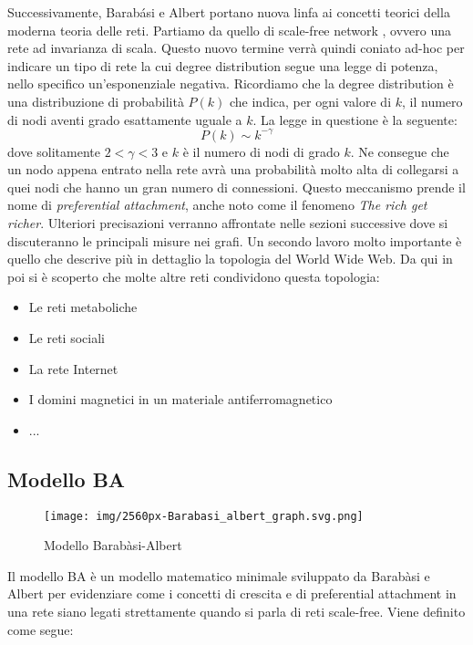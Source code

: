\documentclass[12pt,twoside]{report}
\begin{document}
	Successivamente, Barabási e Albert portano nuova linfa ai concetti teorici della moderna teoria delle reti. Partiamo da quello di scale-free network \cite{scalinginrandomnetworks}, ovvero una rete ad invarianza di scala. Questo nuovo termine verrà quindi coniato ad-hoc per indicare un tipo di rete la cui degree distribution segue una legge di potenza, nello specifico un'esponenziale negativa. Ricordiamo che la degree distribution è una distribuzione di probabilità $P(k)$ che indica, per ogni valore di $k$, il numero di nodi aventi grado esattamente uguale a $k$. La legge in questione è la seguente:
	\begin{equation}
	    P(k) \sim k^{-\gamma}
	\end{equation}
	dove solitamente $2<\gamma<3$ e $k$ è il numero di nodi di grado $k$.
	Ne consegue che un nodo appena entrato nella rete avrà una probabilità molto alta di collegarsi a quei nodi che hanno un gran numero di connessioni. Questo meccanismo prende il nome di \textit{preferential attachment}, anche noto come il fenomeno \textit{The rich get richer}.
	Ulteriori precisazioni verranno affrontate nelle sezioni successive dove si discuteranno le principali misure nei grafi.
	Un secondo lavoro molto importante è quello che descrive più in dettaglio la topologia del World Wide Web\cite{wwwpowerlaw}. Da qui in poi si è scoperto che molte altre reti condividono questa topologia:
	\begin{itemize}
	    \item Le reti metaboliche
	    \item Le reti sociali
	    \item La rete Internet
	    \item I domini magnetici in un materiale antiferromagnetico
	    \item ...
	\end{itemize}\clearpage
	
	\subsection{Modello BA}
	
	\begin{figure}[h]
	    \centering
	    \texttt{[image: img/2560px-Barabasi\_albert\_graph.svg.png]}
	    \caption{Modello Barabàsi-Albert}
	    \label{fig:my_label}
	\end{figure}
	\FloatBarrier
	Il modello BA è un modello matematico minimale sviluppato da Barabàsi e Albert per evidenziare come i concetti di crescita e di preferential attachment in una rete siano legati strettamente quando si parla di reti scale-free. Viene definito come segue:\vspace{2em}
	
\end{document}

